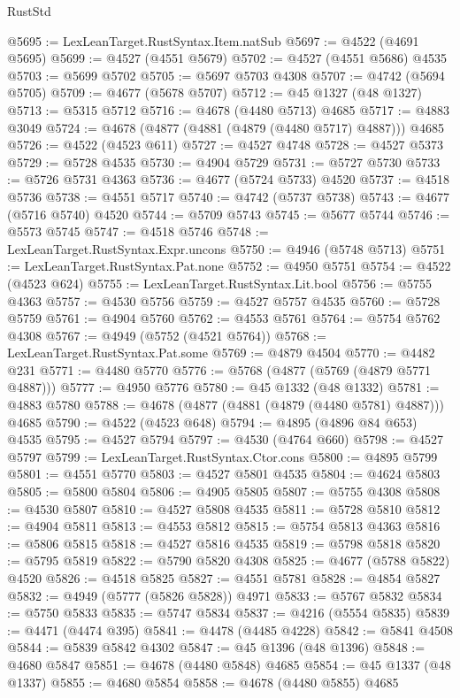 \begin{lexlean}{RustStd}
\begin{coremodule}
@5695 := LexLeanTarget.RustSyntax.Item.natSub
@5697 := @4522 (@4691 @5695)
@5699 := @4527 (@4551 @5679)
@5702 := @4527 (@4551 @5686) @4535
@5703 := @5699 @5702
@5705 := @5697 @5703 @4308
@5707 := @4742 (@5694 @5705)
@5709 := @4677 (@5678 @5707)
@5712 := @45 @1327 (@48 @1327)
@5713 := @5315 @5712
@5716 := @4678 (@4480 @5713) @4685
@5717 := @4883 @3049
@5724 := @4678 (@4877 (@4881 (@4879 (@4480 @5717) @4887))) @4685
@5726 := @4522 (@4523 @611)
@5727 := @4527 @4748
@5728 := @4527 @5373
@5729 := @5728 @4535
@5730 := @4904 @5729
@5731 := @5727 @5730
@5733 := @5726 @5731 @4363
@5736 := @4677 (@5724 @5733) @4520
@5737 := @4518 @5736
@5738 := @4551 @5717
@5740 := @4742 (@5737 @5738)
@5743 := @4677 (@5716 @5740) @4520
@5744 := @5709 @5743
@5745 := @5677 @5744
@5746 := @5573 @5745
@5747 := @4518 @5746
@5748 := LexLeanTarget.RustSyntax.Expr.uncons
@5750 := @4946 (@5748 @5713)
@5751 := LexLeanTarget.RustSyntax.Pat.none
@5752 := @4950 @5751
@5754 := @4522 (@4523 @624)
@5755 := LexLeanTarget.RustSyntax.Lit.bool
@5756 := @5755 @4363
@5757 := @4530 @5756
@5759 := @4527 @5757 @4535
@5760 := @5728 @5759
@5761 := @4904 @5760
@5762 := @4553 @5761
@5764 := @5754 @5762 @4308
@5767 := @4949 (@5752 (@4521 @5764))
@5768 := LexLeanTarget.RustSyntax.Pat.some
@5769 := @4879 @4504
@5770 := @4482 @231
@5771 := @4480 @5770
@5776 := @5768 (@4877 (@5769 (@4879 @5771 @4887)))
@5777 := @4950 @5776
@5780 := @45 @1332 (@48 @1332)
@5781 := @4883 @5780
@5788 := @4678 (@4877 (@4881 (@4879 (@4480 @5781) @4887))) @4685
@5790 := @4522 (@4523 @648)
@5794 := @4895 (@4896 @84 @653) @4535
@5795 := @4527 @5794
@5797 := @4530 (@4764 @660)
@5798 := @4527 @5797
@5799 := LexLeanTarget.RustSyntax.Ctor.cons
@5800 := @4895 @5799
@5801 := @4551 @5770
@5803 := @4527 @5801 @4535
@5804 := @4624 @5803
@5805 := @5800 @5804
@5806 := @4905 @5805
@5807 := @5755 @4308
@5808 := @4530 @5807
@5810 := @4527 @5808 @4535
@5811 := @5728 @5810
@5812 := @4904 @5811
@5813 := @4553 @5812
@5815 := @5754 @5813 @4363
@5816 := @5806 @5815
@5818 := @4527 @5816 @4535
@5819 := @5798 @5818
@5820 := @5795 @5819
@5822 := @5790 @5820 @4308
@5825 := @4677 (@5788 @5822) @4520
@5826 := @4518 @5825
@5827 := @4551 @5781
@5828 := @4854 @5827
@5832 := @4949 (@5777 (@5826 @5828)) @4971
@5833 := @5767 @5832
@5834 := @5750 @5833
@5835 := @5747 @5834
@5837 := @4216 (@5554 @5835)
@5839 := @4471 (@4474 @395)
@5841 := @4478 (@4485 @4228)
@5842 := @5841 @4508
@5844 := @5839 @5842 @4302
@5847 := @45 @1396 (@48 @1396)
@5848 := @4680 @5847
@5851 := @4678 (@4480 @5848) @4685
@5854 := @45 @1337 (@48 @1337)
@5855 := @4680 @5854
@5858 := @4678 (@4480 @5855) @4685

\end{coremodule}
\end{lexlean}
